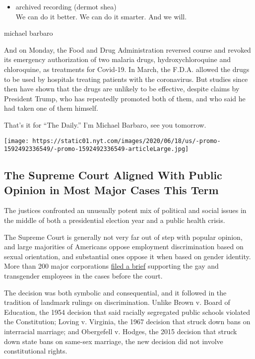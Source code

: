 \begin{itemize}
\tightlist
\item
  archived recording (dermot shea)\\
  We can do it better. We can do it smarter. And we will.
\end{itemize}

michael barbaro

And on Monday, the Food and Drug Administration reversed course and
revoked its emergency authorization of two malaria drugs,
hydroxychloroquine and chloroquine, as treatments for Covid-19. In
March, the F.D.A. allowed the drugs to be used by hospitals treating
patients with the coronavirus. But studies since then have shown that
the drugs are unlikely to be effective, despite claims by President
Trump, who has repeatedly promoted both of them, and who said he had
taken one of them himself.

That's it for ``The Daily.'' I'm Michael Barbaro, see you tomorrow.

\href{https://www.nytimes.com/interactive/2020/06/15/us/supreme-court-major-cases-2020.html}{}

\texttt{[image: https://static01.nyt.com/images/2020/06/18/us/-promo-1592492336549/-promo-1592492336549-articleLarge.jpg]}

\hypertarget{the-supreme-court-aligned-with-public-opinion-in-most-major-cases-this-term}{%
\subsection{The Supreme Court Aligned With Public Opinion in Most Major
Cases This
Term}\label{the-supreme-court-aligned-with-public-opinion-in-most-major-cases-this-term}}

The justices confronted an unusually potent mix of political and social
issues in the middle of both a presidential election year and a public
health crisis.

The Supreme Court is generally not very far out of step with popular
opinion, and large majorities of Americans oppose employment
discrimination based on sexual orientation, and substantial ones oppose
it when based on gender identity. More than 200 major corporations
\href{https://www.supremecourt.gov/DocketPDF/17/17-1618/106953/20190703115551379_2019.07.03\%20-\%20Amicus\%20Brief\%20of\%20206\%20Businesses\%20in\%20Support\%20of\%20Employees.pdf}{filed
a brief} supporting the gay and transgender employees in the cases
before the court.

The decision was both symbolic and consequential, and it followed in the
tradition of landmark rulings on discrimination. Unlike Brown v. Board
of Education, the 1954 decision that said racially segregated public
schools violated the Constitution; Loving v. Virginia, the 1967 decision
that struck down bans on interracial marriage; and Obergefell v. Hodges,
the 2015 decision that struck down state bans on same-sex marriage, the
new decision did not involve constitutional rights.

